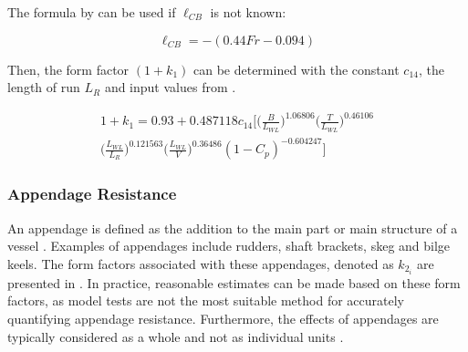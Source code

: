 The formula by  can be used if $\ell_{CB}$ is not known:

\begin{equation}
    \label{eqn:lcb}
    \ell_{CB} = -(0.44Fr - 0.094)
\end{equation}

Then, the form factor $(1+k_1)$ can be determined with the constant $c_{14}$, the length of run $L_R$ and input values from .

\begin{multline}\label{eqn:1+k1}
    1+k_1 = 0.93 + 0.487118c_{14}\Biggl[ \Biggl(\frac{B}{L_{WL}}\Biggr)^{1.06806}  \Biggl(\frac{T}{L_{WL}}\Biggr)^{0.46106} \\ 
    \Biggl(\frac{L_{WL}}{L_R}\Biggr)^{0.121563} \Biggl(\frac{L_{WL}}{V}\Biggr)^{0.36486} (1-C_p)^{-0.604247} \Biggr] 
\end{multline}

\subsubsection*{Appendage Resistance}

An appendage is defined as the addition to the main part or main structure of a vessel . Examples of appendages include rudders, shaft brackets, skeg and bilge keels. The form factors associated with these appendages, denoted as $k_{2_i}$ are presented in . In practice, reasonable estimates can be made based on these form factors, as model tests are not the most suitable method for accurately quantifying appendage resistance. Furthermore, the effects of appendages are typically considered as a whole and not as individual units .\\

